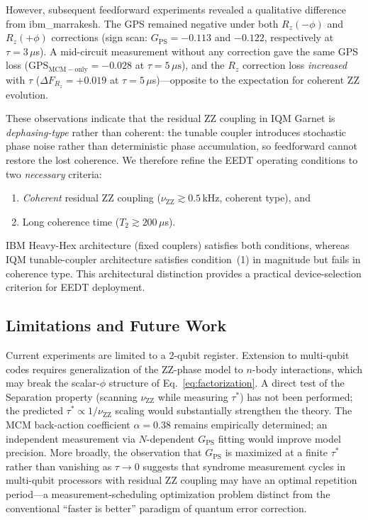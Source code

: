 \documentclass[10pt,twocolumn]{article}
\newcommand{\GPS}{G_{\mathrm{PS}}}
\newcommand{\nuZZ}{\nu_{\mathrm{ZZ}}}
\newcommand{\taustar}{\tau^*}
\begin{document}
However, subsequent feedforward experiments revealed a qualitative difference
from ibm\_marrakesh.
The GPS remained negative under both $R_z(-\phi)$ and $R_z(+\phi)$
corrections (sign scan: $\GPS = -0.113$ and $-0.122$, respectively at $\tau=3\,\mu$s).
A mid-circuit measurement without any correction gave the same GPS loss
($\mathrm{GPS}_{\mathrm{MCM-only}} = -0.028$ at $\tau=5\,\mu\mathrm{s}$), and the
$R_z$ correction loss \emph{increased} with $\tau$
($\Delta F_{R_z}=+0.019$ at $\tau=5\,\mu$s)---opposite to the expectation
for coherent ZZ evolution.

These observations indicate that the residual ZZ coupling in IQM Garnet is
\emph{dephasing-type} rather than coherent: the tunable coupler introduces
stochastic phase noise rather than deterministic phase accumulation,
so feedforward cannot restore the lost coherence.
We therefore refine the EEDT operating conditions to two \emph{necessary} criteria:
\begin{enumerate}
  \item \emph{Coherent} residual ZZ coupling ($\nuZZ\gtrsim0.5$\,kHz, coherent type), and
  \item Long coherence time ($T_2\gtrsim200\,\mu$s).
\end{enumerate}
IBM Heavy-Hex architecture (fixed couplers) satisfies both conditions,
whereas IQM tunable-coupler architecture satisfies condition~(1) in
magnitude but fails in coherence type.
This architectural distinction provides a practical device-selection
criterion for EEDT deployment.

\subsection{Limitations and Future Work}

Current experiments are limited to a 2-qubit register.
Extension to multi-qubit codes requires generalization of the ZZ-phase
model to $n$-body interactions, which may break the scalar-$\phi$ structure
of Eq.~\eqref{eq:factorization}.
A direct test of the Separation property (scanning $\nuZZ$ while measuring
$\taustar$) has not been performed; the predicted $\taustar \propto 1/\nuZZ$
scaling would substantially strengthen the theory.
The MCM back-action coefficient $\alpha = 0.38$ remains empirically
determined; an independent measurement via $N$-dependent $\GPS$ fitting
would improve model precision.
More broadly, the observation that $\GPS$ is maximized at a finite
$\taustar$ rather than vanishing as $\tau\to 0$ suggests that
syndrome measurement cycles in multi-qubit processors with residual ZZ
coupling may have an optimal repetition period---a measurement-scheduling
optimization problem distinct from the conventional ``faster is better''
paradigm of quantum error correction.
\end{document}
